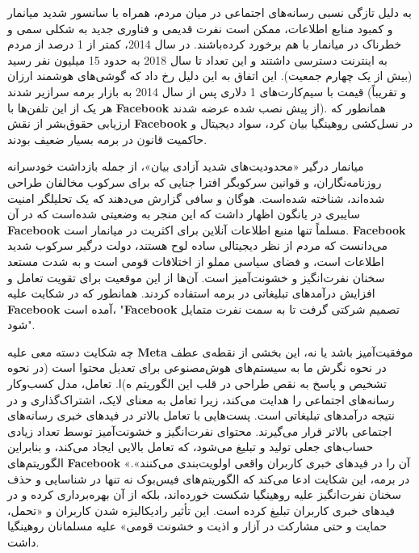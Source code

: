 به دلیل تازگی نسبی رسانه‌های اجتماعی در میان مردم، همراه با سانسور شدید میانمار و کمبود منابع اطلاعات، ممکن است نفرت قدیمی و فناوری جدید به شکلی سمی و خطرناک در میانمار با هم برخورد کرده‌باشند.
در سال 2014، کمتر از 1 درصد از مردم به اینترنت دسترسی داشتند و این تعداد تا سال 2018 به حدود 15 میلیون نفر رسید (بیش از یک چهارم جمعیت).
این اتفاق به این دلیل رخ داد که گوشی‌های هوشمند ارزان قیمت با سیم‌کارت‌های 1 دلاری پس از سال 2014 به بازار برمه سرازیر شدند (و تقریباً هر یک از این تلفن‌ها با \textenglish{\textbf{Facebook}} از پیش نصب شده عرضه شدند).
همانطور که ارزیابی حقوق‌بشر از نقش \textenglish{\textbf{Facebook}} در نسل‌کشی روهینگیا بیان کرد، سواد دیجیتال و حاکمیت قانون در برمه بسیار ضعیف بودند.

میانمار درگیر «محدودیت‌های شدید آزادی بیان»، از جمله بازداشت خودسرانه روزنامه‌نگاران، و قوانین سرکوبگر افترا جنایی که برای سرکوب مخالفان طراحی شده‌اند، شناخته شده‌است.
هوگان و سافی گزارش می‌دهند که یک تحلیلگر امنیت سایبری در یانگون اظهار داشت که این منجر به وضعیتی شده‌است که در آن \textenglish{\textbf{Facebook}} مسلماً تنها منبع اطلاعات آنلاین برای اکثریت در میانمار است.
\textenglish{\textbf{Facebook}} می‌دانست که مردم از نظر دیجیتالی ساده لوح هستند، دولت درگیر سرکوب شدید اطلاعات است، و فضای سیاسی مملو از اختلافات قومی است و به شدت مستعد سخنان نفرت‌انگیز و خشونت‌آمیز است.
آن‌ها از این موقعیت برای تقویت تعامل و افزایش درآمدهای تبلیغاتی در برمه استفاده کردند.
همانطور که در شکایت علیه \textenglish{\textbf{Facebook}} آمده است، "\textenglish{\textbf{Facebook}} تصمیم شرکتی گرفت تا به سمت نفرت متمایل شود".

چه شکایت دسته ‌معی علیه \textenglish{\textbf{Meta}} موفقیت‌آمیز باشد یا نه، این بخشی از نقطه‌ی عطف در نحوه نگرش ما به سیستم‌های هوش‌مصنوعی برای تعدیل محتوا است (در نحوه تشخیص و پاسخ به نقص طراحی در قلب این الگوریتم ه)ا.
تعامل، مدل کسب‌وکار رسانه‌های اجتماعی را هدایت می‌کند، زیرا تعامل به معنای لایک، اشتراک‌گذاری و در نتیجه درآمدهای تبلیغاتی است.
پست‌هایی با تعامل بالاتر در فیدهای خبری رسانه‌های اجتماعی بالاتر قرار می‌گیرند.
محتوای نفرت‌انگیز و خشونت‌آمیز توسط تعداد زیادی حساب‌های جعلی تولید و تبلیغ می‌شود، که تعامل بالایی ایجاد می‌کند، و بنابراین الگوریتم‌های \textenglish{\textbf{Facebook}} «آن را در فیدهای خبری کاربران واقعی اولویت‌بندی می‌کنند».
در برمه، این شکایت ادعا می‌کند که الگوریتم‌های فیس‌بوک نه تنها در شناسایی و حذف سخنان نفرت‌انگیز علیه روهینگیا شکست خورده‌اند، بلکه از آن بهره‌برداری کرده و در فیدهای خبری کاربران تبلیغ کرده است.
این تأثیر رادیکالیزه شدن کاربران و «تحمل، حمایت و حتی مشارکت در آزار و اذیت و خشونت قومی» علیه مسلمانان روهینگیا داشت.
\newline
\newline


